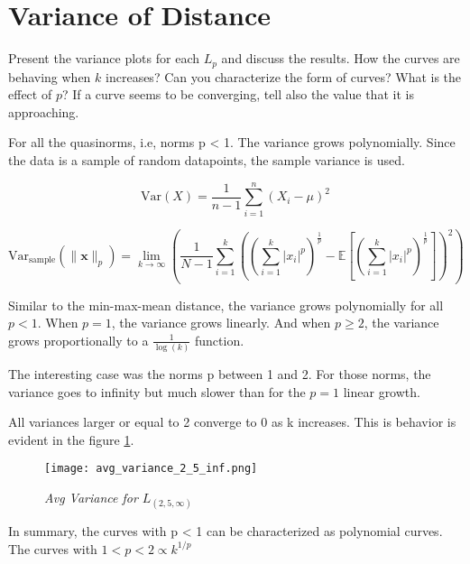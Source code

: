 
\section{Variance of Distance}\label{sec:variance}
Present the variance plots for each \( L_p \) and discuss the results. How the curves are behaving when \( k \) increases? Can you characterize the form of curves? What is the effect of \( p \)? If a curve seems to be converging, tell also the value that it is approaching.



For all the quasinorms, i.e, norms p < 1. The variance grows polynomially. Since the data is a sample of random datapoints, the sample variance is used.

\[
    \text{Var}(X) = \frac{1}{n -1 } \sum_{i=1}^{n} \left(X_i - \mu \right)^2
\]


\begin{equation}
    \text{Var}_{\text{sample}}\left(\|\mathbf{x}\|_p\right) = \lim_{k \to \infty} \left( \frac{1}{N - 1} \sum_{i=1}^{k} \left( \left( \sum_{i=1}^{k} |x_i|^p \right)^{\frac{1}{p}} - \mathbb{E}\left[\left( \sum_{i=1}^{k} |x_i|^p \right)^{\frac{1}{p}}\right] \right)^2 \right)
\end{equation}

Similar to the min-max-mean distance, the variance grows polynomially for all \(p < 1\). When \(p = 1\), the variance grows linearly. And when \(p \geq 2\), the variance grows proportionally to a \(\frac{1}{\log(k)}\) function.

The interesting case was the norms p between 1 and 2. For those norms, the variance goes to infinity but much slower than for the \(p=1\) linear growth.

All variances larger or equal to 2 converge to 0 as k increases. This is behavior is evident in the figure \ref{fig:avg_variance_2_5_inf}.



\begin{figure}[ht!]
    \centering
    \texttt{[image: avg\_variance\_2\_5\_inf.png]}
    \caption{\emph{Avg Variance for \(L_{(2,5,\infty)}\)}}
    \label{fig:avg_variance_2_5_inf}
\end{figure}



In summary, the curves with p < 1 can be characterized as polynomial curves. The curves with $ 1 < p < 2 \propto k^{1/p}$

